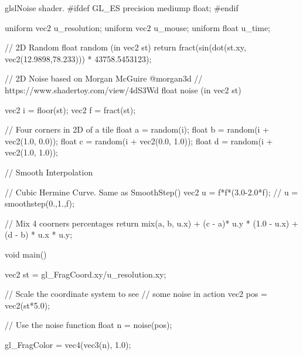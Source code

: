 \newpage
\begin{sourcecode}{glsl}{Noise shader.}
#ifdef GL_ES
precision mediump float;
#endif

uniform vec2 u_resolution;
uniform vec2 u_mouse;
uniform float u_time;

// 2D Random
float random (in vec2 st) {
	return fract(sin(dot(st.xy,
	vec2(12.9898,78.233)))
	* 43758.5453123);
}

// 2D Noise based on Morgan McGuire @morgan3d
// https://www.shadertoy.com/view/4dS3Wd
float noise (in vec2 st) {
	vec2 i = floor(st);
	vec2 f = fract(st);
	
	// Four corners in 2D of a tile
	float a = random(i);
	float b = random(i + vec2(1.0, 0.0));
	float c = random(i + vec2(0.0, 1.0));
	float d = random(i + vec2(1.0, 1.0));
	
	// Smooth Interpolation
	
	// Cubic Hermine Curve.  Same as SmoothStep()
	vec2 u = f*f*(3.0-2.0*f);
	// u = smoothstep(0.,1.,f);
	
	// Mix 4 coorners percentages
	return mix(a, b, u.x) +
	(c - a)* u.y * (1.0 - u.x) +
	(d - b) * u.x * u.y;
}

void main() {
	vec2 st = gl_FragCoord.xy/u_resolution.xy;
	
	// Scale the coordinate system to see
	// some noise in action
	vec2 pos = vec2(st*5.0);
	
	// Use the noise function
	float n = noise(pos);
	
	gl_FragColor = vec4(vec3(n), 1.0);
}
\end{sourcecode}